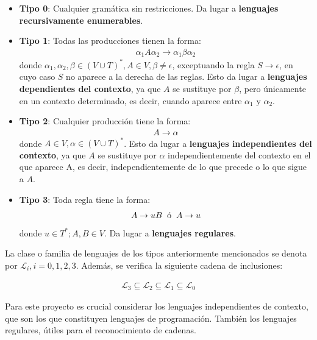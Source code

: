 \begin{itemize}
    \item \textbf{Tipo 0}: Cualquier gramática sin restricciones. Da lugar a \textbf{lenguajes recursivamente enumerables}.
    \item \textbf{Tipo 1}: Todas las producciones tienen la forma:
    \begin{align*}
        \alpha_1 A \alpha_2 \rightarrow \alpha_1 \beta \alpha_2
    \end{align*}
    donde $\alpha_1,\alpha_2,\beta \in (V \cup T)^*, A \in V, \beta \neq \epsilon$, exceptuando la regla $S \rightarrow \epsilon$, en cuyo caso $S$ no aparece a la derecha de las reglas. Esto da lugar a \textbf{lenguajes dependientes del contexto}, ya que $A$ se sustituye por $\beta$, pero únicamente en un contexto determinado, es decir, cuando aparece entre $\alpha_1$ y $\alpha_2$.
    \item \textbf{Tipo 2}: Cualquier producción tiene la forma:
    \begin{align*}
        A \rightarrow \alpha
    \end{align*}
    donde $A \in V, \alpha \in (V \cup T)^*$. Esto da lugar a \textbf{lenguajes independientes del contexto}, ya que $A$ se sustituye por $\alpha$ independientemente del contexto en el que aparece A, es decir, independientemente de lo que precede o lo que sigue a $A$.
    \item \textbf{Tipo 3}: Toda regla tiene la forma:
    \begin{align*}
        A \rightarrow uB \hspace{0.2cm} \text{ó} \hspace{0.2cm} A \rightarrow u
    \end{align*}
    donde $u \in T^*; A,B \in V$. Da lugar a \textbf{lenguajes regulares}.
\end{itemize}

La clase o familia de lenguajes de los tipos anteriormente mencionados se denota por $\mathcal{L}_i, i = 0,1,2,3$. Además, se verifica la siguiente cadena de inclusiones:

\begin{align*}
    \mathcal{L}_3 \subseteq \mathcal{L}_2 \subseteq \mathcal{L}_1 \subseteq \mathcal{L}_0
\end{align*}

Para este proyecto es crucial considerar los lenguajes independientes de contexto, que son los que constituyen lenguajes de programación. También los lenguajes regulares, útiles para el reconocimiento de cadenas.

